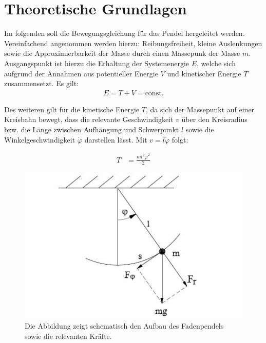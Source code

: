 \section{Theoretische Grundlagen}
\label{theorie}



Im folgenden soll die Bewegungsgleichung für das Pendel hergeleitet werden. Vereinfachend angenommen werden hierzu: Reibungsfreiheit, kleine Auslenkungen sowie die Approximierbarkeit der Masse durch einen Massepunk der Masse $m$. 
Ausgangspunkt ist hierzu die Erhaltung der Systemenergie $E$, welche sich aufgrund der Annahmen aus potentieller Energie $V$ und kinetischer Energie $T$ zusammensetzt. Es gilt:
\begin{align}
E=T+V=\textrm{const.}
\label{energie}
\end{align}

Des weiteren gilt für die kinetische Energie $T$, da sich der Massepunkt auf einer Kreisbahn bewegt, dass die relevante Geschwindigkeit $v$ über den Kreisradius bzw. die Länge zwischen Aufhängung und Schwerpunkt $l$ sowie die Winkelgeschwindigkeit $\dot{\varphi}$ darstellen lässt. Mit $v=l\dot{\varphi}$ folgt:
 
\begin{align}
T&=\frac{ml^2\dot{\varphi}^2}{2}
\label{kin}
\end{align}


\begin{figure}
	\centering
	\includegraphics{faden}
	\caption{Die Abbildung zeigt schematisch den Aufbau des Fadenpendels sowie die relevanten Kräfte.}
	\label{faden}
\end{figure}

